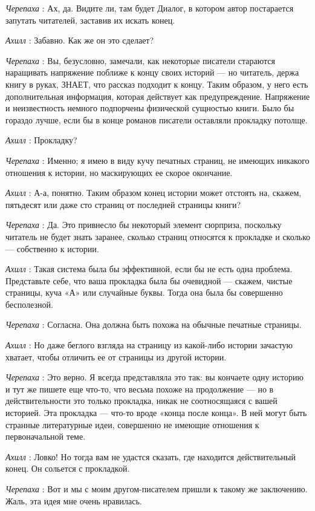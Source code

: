\emph{Черепаха} : Ах, да. Видите ли, там будет Диалог, в котором автор постарается запутать читателей, заставив их искать конец.

\emph{Ахилл} : Забавно. Как же он это сделает?

\emph{Черепаха} : Вы, безусловно, замечали, как некоторые писатели стараются наращивать напряжение поближе к концу своих историй --- но читатель, держа книгу в руках, ЗНАЕТ, что рассказ подходит к концу. Таким образом, у него есть дополнительная информация, которая действует как предупреждение. Напряжение и неизвестность немного подпорчены физической сущностью книги. Было бы гораздо лучше, если бы в конце романов писатели оставляли прокладку потолще.

\emph{Ахилл} : Прокладку?

\emph{Черепаха} : Именно; я имею в виду кучу печатных страниц, не имеющих никакого отношения к истории, но маскирующих ее скорое окончание.

\emph{Ахилл} : А-а, понятно. Таким образом конец истории может отстоять на, скажем, пятьдесят или даже сто страниц от последней страницы книги?

\emph{Черепаха} : Да. Это привнесло бы некоторый элемент сюрприза, поскольку читатель не будет знать заранее, сколько страниц относятся к прокладке и сколько --- собственно к истории.

\emph{Ахилл} : Такая система была бы эффективной, если бы не есть одна проблема. Представьте себе, что ваша прокладка была бы очевидной --- скажем, чистые страницы, куча «А» или случайные буквы. Тогда она была бы совершенно бесполезной.

\emph{Черепаха} : Согласна. Она должна быть похожа на обычные печатные страницы.

\emph{Ахилл} : Но даже беглого взгляда на страницу из какой-либо истории зачастую хватает, чтобы отличить ее от страницы из другой истории.

\emph{Черепаха} : Это верно. Я всегда представляла это так: вы кончаете одну историю и тут же пишете еще что-то, что весьма похоже на продолжение --- но в действительности это только прокладка, никак не соотносящаяся с вашей историей. Эта прокладка --- что-то вроде «конца после конца». В ней могут быть странные литературные идеи, совершенно не имеющие отношения к первоначальной теме.

\emph{Ахилл} : Ловко! Но тогда вам не удастся сказать, где находится действительный конец. Он сольется с прокладкой.

\emph{Черепаха} : Вот и мы с моим другом-писателем пришли к такому же заключению. Жаль, эта идея мне очень нравилась.

